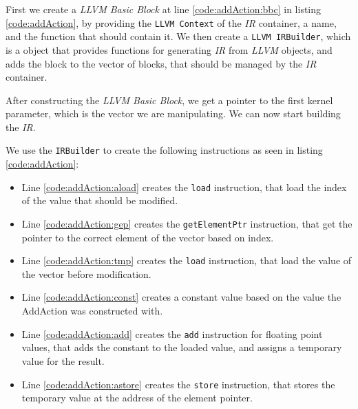 First we create a \textit{LLVM Basic Block} at line \ref{code:addAction:bbc} in listing \ref{code:addAction}, by providing the \texttt{LLVM Context} of the \textit{IR} container, a name, and the function that should contain it. We then create a \texttt{LLVM IRBuilder}, which is a object that provides functions for generating \textit{IR} from \textit{LLVM} objects, and adds the block to the vector of blocks, that should be managed by the \textit{IR} container.

After constructing the \textit{LLVM Basic Block}, we get a pointer to the first kernel parameter, which is the vector we are manipulating. We can now start building the \textit{IR}.

We use the \texttt{IRBuilder} to create the following instructions as seen in listing \ref{code:addAction}:
\begin{itemize}
\item Line \ref{code:addAction:aload} creates the \texttt{load} instruction, that load the index of the value that should be modified.
\item Line \ref{code:addAction:gep} creates the \texttt{getElementPtr} instruction, that get the pointer to the correct element of the vector based on index.
\item Line \ref{code:addAction:tmp} creates the \texttt{load} instruction, that load the value of the vector before modification.
\item Line \ref{code:addAction:const} creates a constant value based on the value the AddAction was constructed with.
\item Line \ref{code:addAction:add} creates the \texttt{add} instruction for floating point values, that adds the constant to the loaded value, and assigns a temporary value for the result.
\item Line \ref{code:addAction:astore} creates the \texttt{store} instruction, that stores the temporary value at the address of the element pointer.
\end{itemize}

